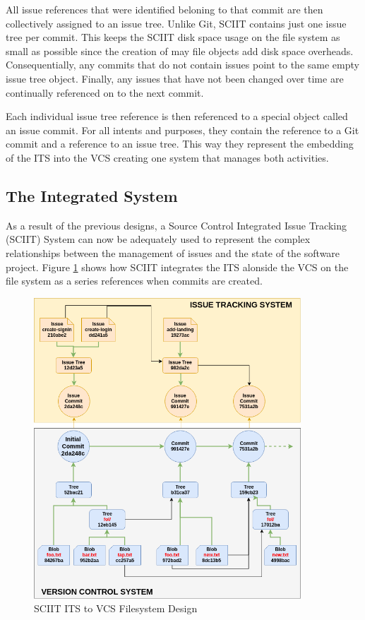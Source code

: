 \documentclass{mproj}
\begin{document}
All issue references that were identified beloning to that commit are then collectively assigned to an issue tree. Unlike Git, SCIIT contains just one issue tree per commit. This keeps the SCIIT disk space usage on the file system as small as possible since the creation of may file objects add disk space overheads. Consequentially, any commits that do not contain issues point to the same empty issue tree object. Finally, any issues that have not been changed over time are continually referenced on to the next commit.

Each individual issue tree reference is then referenced to a special object called an issue commit. For all intents and purposes, they contain the reference to a Git commit and a reference to an issue tree. This way they represent the embedding of the ITS into the VCS creating one system that manages both activities. 




\subsection{The Integrated System}

As a result of the previous designs, a Source Control Integrated Issue Tracking (SCIIT) System can now be adequately used to represent the complex relationships between the management of issues and the state of the software project. Figure \ref{fig:sciit-filesystem} shows how SCIIT integrates the ITS alonside the VCS on the file system as a series references when commits are created.

\begin{figure}[t]
\caption{SCIIT ITS to VCS Filesystem Design}
\label{fig:sciit-filesystem}
\centering
\includegraphics[width=10cm]{sciit-filesystem}
\end{figure}
\end{document}
